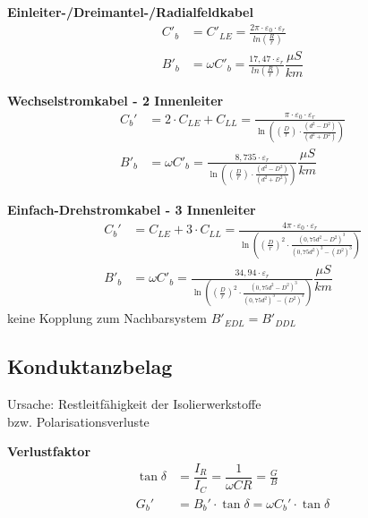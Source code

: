 \textbf{Einleiter-/Dreimantel-/Radialfeldkabel}
\begin{align*}
    C'_b &= C'_{LE} = \frac{2\pi \cdot \varepsilon_0 \cdot \varepsilon_r}{ln \left( \frac{R}{r} \right)}\\
    B'_b &= \omega C'_b  = \frac{17,47 \cdot \varepsilon_r}{ln \left(\frac{R}{r} \right)} \dfrac{\mu S}{km}
\end{align*}

\textbf{Wechselstromkabel - 2 Innenleiter}
\begin{align*}
    C_{b}' &= 2 \cdot C_{LE} + C_{LL} = \frac{\pi \cdot \varepsilon_{0} \cdot \varepsilon_{r}}{\ln \left( \left(\frac{D}{r}\right) \cdot \frac{(d^2 - D^2)}{(d^2 + D^2)} \right)}\\
    B'_b  &= \omega C'_b = \frac{8,735 \cdot \varepsilon_{r}}{\ln \left( \left(\frac{D}{r}\right) \cdot \frac{(d^2 - D^2)}{(d^2 + D^2)} \right)} \dfrac{\mu S}{km}
\end{align*}

\textbf{Einfach-Drehstromkabel - 3 Innenleiter}
\begin{align*}
    C_{b}' &= C_{LE} + 3 \cdot C_{LL} = \frac{4 \pi \cdot \varepsilon_{0} \cdot \varepsilon_{r}}{\ln \left( \left(\frac{D}{r}\right)^2 \cdot \frac{(0,75d^2 - D^2)^3}{(0,75d^2)^3 - (D^2)^3} \right)}\\
    B'_b &= \omega C'_b = \frac{34,94 \cdot \varepsilon_{r}}{\ln \left( \left(\frac{D}{r}\right)^2 \cdot \frac{(0,75d^2 - D^2)^3}{(0,75d^2)^3 - (D^2)^3} \right)}
     \dfrac{\mu S}{km}
\end{align*}
\indent keine Kopplung zum Nachbarsystem $B'_{\mathit{EDL}} = B'_{\mathit{DDL}}$

\subsection{Konduktanzbelag}
Ursache: Restleitfähigkeit der Isolierwerkstoffe\\ \indent bzw. Polarisationsverluste

\textbf{Verlustfaktor}
\begin{align*}
    \tan \delta &= \dfrac{I_{R}}{I_{C}} = \dfrac{1}{\omega C R} = \frac{G}{B}\\
    G_{b}' &= B_{b}' \cdot \tan \delta = \omega C_{b}' \cdot \tan \delta
\end{align*}
\begin{center}

\end{center}

